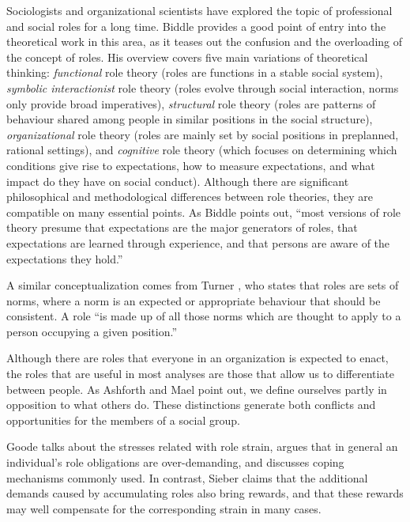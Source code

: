 \documentclass[10pt, conference, compsocconf]{IEEEtran}
\begin{document}
Sociologists and organizational scientists have explored the topic of professional and social roles for a long time. Biddle \cite{Biddle1986} provides a good point of entry into the theoretical work in this area, as it teases out the confusion and the overloading of the concept of roles. His overview covers five main variations of theoretical thinking: \emph{functional} role theory (roles are functions in a stable social system), \emph{symbolic interactionist} role theory (roles evolve through social interaction, norms only provide broad imperatives), \emph{structural} role theory (roles are patterns of behaviour shared among people in similar positions in the social structure), \emph{organizational} role theory (roles are mainly set by social positions in preplanned, rational settings), and \emph{cognitive} role theory (which focuses on determining which conditions give rise to expectations, how to measure expectations, and what impact do they have on social conduct). Although there are significant philosophical and methodological differences between role theories, they are compatible on many essential points. As Biddle points out, ``most versions of role theory presume that expectations are the major generators of roles, that expectations are learned through experience, and that persons are aware of the expectations they hold.''

A similar conceptualization comes from Turner \cite{Turner1956}, who states that roles are sets of norms, where a norm is an expected or appropriate behaviour that should be consistent. A role ``is made up of all those norms which are thought to apply to a person occupying a given position.''

Although there are roles that everyone in an organization is expected to enact, the roles that are useful in most analyses are those that allow us to differentiate between people. As Ashforth and Mael \cite{Ashforth1989} point out, we define ourselves partly in opposition to what others do. These distinctions generate both conflicts and opportunities for the members of a social group.

Goode \cite{Goode1960} talks about the stresses related with role strain, argues that in general an individual's role obligations are over-demanding, and discusses coping mechanisms commonly used. In contrast, Sieber \cite{Sieber1974} claims that the additional demands caused by accumulating roles also bring rewards, and that these rewards may well compensate for the corresponding strain in many cases. 
\end{document}
